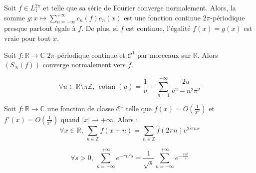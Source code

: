 	
	\begin{proposition}
		Soit $f \in L_1^{2\pi}$ et telle que sa série de Fourier converge normalement. Alors, la somme $g : x \mapsto \sum_{n=-\infty}^{+\infty} c_n(f) e_n(x)$ est une fonction continue $2\pi$-périodique presque partout égale à $f$. De plus, si $f$ est continue, l'égalité $f(x) = g(x)$ est vraie pour tout $x$.
	\end{proposition}
	
	\begin{proposition}
		Soit $f : \mathbb{R} \rightarrow \mathbb{C}$ $2\pi$-périodique continue et $\mathcal{C}^1$ par morceaux sur $\mathbb{R}$. Alors $(S_N(f))$ converge normalement vers $f$.
	\end{proposition}
	
	
	\begin{application}
		\[ \forall u \in \mathbb{R} \setminus \pi \mathbb{Z}, \, \operatorname{cotan}(u) = \frac{1}{u} + \sum_{n=1}^{+\infty} \frac{2u}{u^2 - n^2 \pi^2} \]
	\end{application}
	
	
	\begin{theorem}
		Soit $f : \mathbb{R} \rightarrow \mathbb{C}$ une fonction de classe $\mathcal{C}^1$ telle que $f(x) = O \left( \frac{1}{x^2} \right)$ et $f'(x) = O \left( \frac{1}{x^2} \right)$ quand $|x| \longrightarrow +\infty$. Alors :
		\[ \forall x \in \mathbb{R}, \, \sum_{n \in \mathbb{Z}} f(x+n) = \sum_{n \in \mathbb{Z}} \widehat{f}(2 \pi n) e^{2 i \pi n x} \]
	\end{theorem}
	
	\begin{application}
		\[ \forall s > 0, \, \sum_{n=-\infty}^{+\infty} e^{-\pi n^2 s} = \frac{1}{\sqrt{s}} \sum_{n=-\infty}^{+\infty} e^{-\frac{\pi n^2}{s}} \]
	\end{application}


